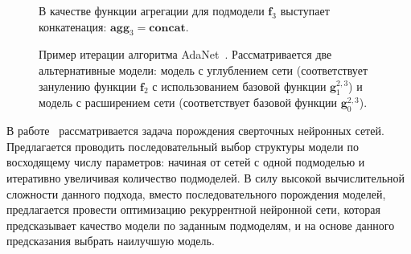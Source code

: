 \begin{figure}

\caption{Пример итерации алгоритма AdaNet~\cite{adanet}. Рассматривается две альтернативные модели: модель с углублением сети (соответствует занулению функции $\mathbf{f}_2$ с использованием базовой функции $\mathbf{g}^{2,3}_1$) и модель с расширением сети (соответствует базовой функции $\mathbf{g}^{2,3}_0$).} В качестве функции агрегации для подмодели $\mathbf{f}_3$ выступает конкатенация: $\textbf{agg}_3 = \textbf{concat}$.
\label{fig:scheme_adanet}
\end{figure}

В работе~\cite{search_smbo} рассматривается задача порождения сверточных нейронных сетей. Предлагается проводить последовательный выбор структуры модели по восходящему числу параметров: начиная от сетей с одной подмоделью  и итеративно увеличивая количество подмоделей. В силу высокой вычислительной сложности данного подхода, вместо последовательного порождения моделей, предлагается провести оптимизацию рекуррентной нейронной сети, которая предсказывает качество модели по заданным подмоделям, и на основе данного предсказания выбрать наилучшую модель.
 
